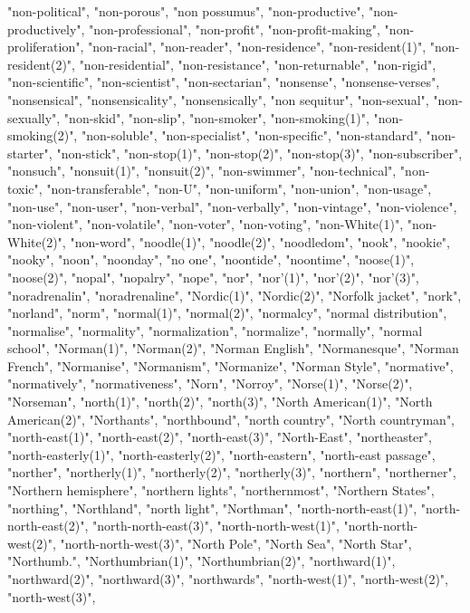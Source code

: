 "non-political",
"non-porous",
"non possumus",
"non-productive",
"non-productively",
"non-professional",
"non-profit",
"non-profit-making",
"non-proliferation",
"non-racial",
"non-reader",
"non-residence",
"non-resident(1)",
"non-resident(2)",
"non-residential",
"non-resistance",
"non-returnable",
"non-rigid",
"non-scientific",
"non-scientist",
"non-sectarian",
"nonsense",
"nonsense-verses",
"nonsensical",
"nonsensicality",
"nonsensically",
"non sequitur",
"non-sexual",
"non-sexually",
"non-skid",
"non-slip",
"non-smoker",
"non-smoking(1)",
"non-smoking(2)",
"non-soluble",
"non-specialist",
"non-specific",
"non-standard",
"non-starter",
"non-stick",
"non-stop(1)",
"non-stop(2)",
"non-stop(3)",
"non-subscriber",
"nonsuch",
"nonsuit(1)",
"nonsuit(2)",
"non-swimmer",
"non-technical",
"non-toxic",
"non-transferable",
"non-U",
"non-uniform",
"non-union",
"non-usage",
"non-use",
"non-user",
"non-verbal",
"non-verbally",
"non-vintage",
"non-violence",
"non-violent",
"non-volatile",
"non-voter",
"non-voting",
"non-White(1)",
"non-White(2)",
"non-word",
"noodle(1)",
"noodle(2)",
"noodledom",
"nook",
"nookie",
"nooky",
"noon",
"noonday",
"no one",
"noontide",
"noontime",
"noose(1)",
"noose(2)",
"nopal",
"nopalry",
"nope",
"nor",
"nor'(1)",
"nor'(2)",
"nor'(3)",
"noradrenalin",
"noradrenaline",
"Nordic(1)",
"Nordic(2)",
"Norfolk jacket",
"nork",
"norland",
"norm",
"normal(1)",
"normal(2)",
"normalcy",
"normal distribution",
"normalise",
"normality",
"normalization",
"normalize",
"normally",
"normal school",
"Norman(1)",
"Norman(2)",
"Norman English",
"Normanesque",
"Norman French",
"Normanise",
"Normanism",
"Normanize",
"Norman Style",
"normative",
"normatively",
"normativeness",
"Norn",
"Norroy",
"Norse(1)",
"Norse(2)",
"Norseman",
"north(1)",
"north(2)",
"north(3)",
"North American(1)",
"North American(2)",
"Northants",
"northbound",
"north country",
"North countryman",
"north-east(1)",
"north-east(2)",
"north-east(3)",
"North-East",
"northeaster",
"north-easterly(1)",
"north-easterly(2)",
"north-eastern",
"north-east passage",
"norther",
"northerly(1)",
"northerly(2)",
"northerly(3)",
"northern",
"northerner",
"Northern hemisphere",
"northern lights",
"northernmost",
"Northern States",
"northing",
"Northland",
"north light",
"Northman",
"north-north-east(1)",
"north-north-east(2)",
"north-north-east(3)",
"north-north-west(1)",
"north-north-west(2)",
"north-north-west(3)",
"North Pole",
"North Sea",
"North Star",
"Northumb.",
"Northumbrian(1)",
"Northumbrian(2)",
"northward(1)",
"northward(2)",
"northward(3)",
"northwards",
"north-west(1)",
"north-west(2)",
"north-west(3)",
